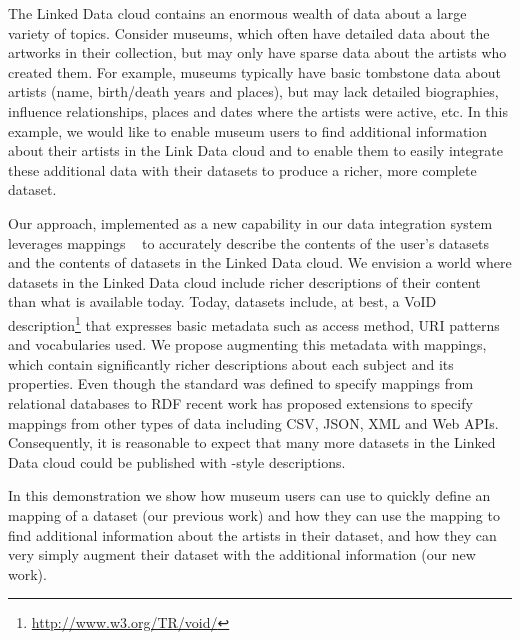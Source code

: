 The Linked Data cloud contains an enormous wealth of data about a large variety of topics.
Consider museums, which often have detailed data about the artworks in their collection, but may only have sparse data about the artists who created them.
For example, museums typically have basic tombstone data about artists (name, birth/death years and places), but may lack detailed biographies, influence relationships, places and dates where the artists were active, etc.
In this example, we would like to enable museum users to find additional information about their artists in the Link Data cloud and to enable them to easily integrate these additional data with their datasets to produce a richer, more complete dataset.

Our approach, implemented as a new capability in our \karma data integration system~\cite{knoblock12:eswc} leverages \rtworml mappings ~\cite{Sundara:12:RRR} to accurately describe the contents of the user's datasets and the contents of datasets in the Linked Data cloud.
We envision a world where datasets in the Linked Data cloud include richer descriptions of their content than what is available today.
Today, datasets include, at best, a VoID description\footnote{\url{http://www.w3.org/TR/void/}} that expresses basic metadata such as access method, URI patterns and vocabularies used.
We propose augmenting this metadata with \rtworml mappings, which contain significantly richer descriptions about each subject and its properties.
Even though the \rtworml standard was defined to specify mappings from relational databases to RDF recent work  has proposed extensions to specify mappings from other types of data including CSV, JSON, XML and Web APIs.
Consequently, it is reasonable to expect that many more datasets in the Linked Data cloud could be published with \rtworml-style descriptions.

In this demonstration we show how museum users can use \karma to quickly define an \rtworml mapping of a dataset (our previous work) and how they can use the \rtworml mapping to find additional information about the artists in their dataset, and how they can very simply augment their dataset with the additional information (our new work).


